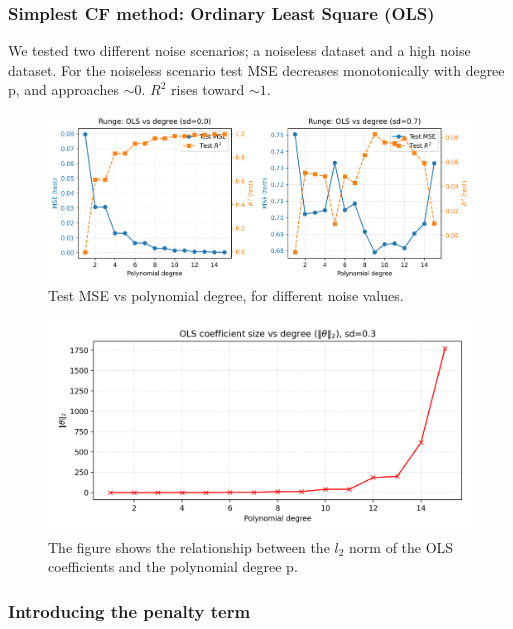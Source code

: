 \documentclass[amssymb,twocolumn,aps]{revtex4}
\begin{document}
\subsubsection{Simplest CF method: Ordinary Least Square (OLS)}

We tested two different noise scenarios;  a noiseless dataset and a high noise dataset. For the noiseless scenario test MSE decreases monotonically with degree p, and approaches $\sim 0$. $R^2$ rises toward $\sim 1$. 

\begin{figure}[H]
    \centering
    \includegraphics[width=1\linewidth]{Project-1/Figures/runge_ols_mse_r2_vs_degree.png}
    \caption{Test MSE vs polynomial degree, for different noise values.}
    \label{fig:ols_vs_degree}
\end{figure}

\begin{figure}[H]
    \centering
    \includegraphics[width=1\linewidth]{Project-1/Figures/runge_ols_theta_norms_vs_degree.png}
    \caption{The figure shows the relationship between the $l_2$ norm of the OLS coefficients and the polynomial degree p.}
    \label{fig:norms_vs_degree}
\end{figure}



\subsubsection{Introducing the penalty term}
\end{document}
